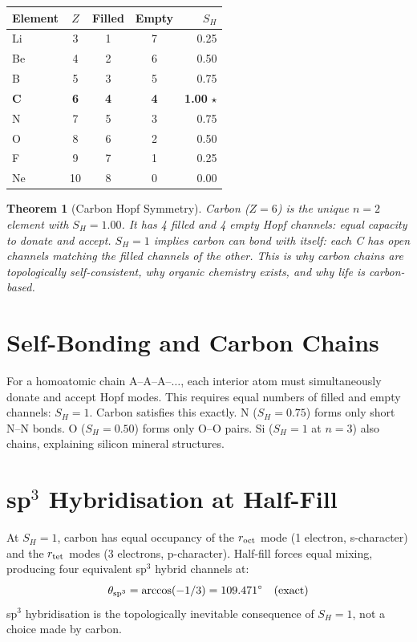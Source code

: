 \documentclass[aps,prl,twocolumn,showpacs,superscriptaddress]{revtex4-2}
\newtheorem{theorem}{Theorem}
\begin{document}
\begin{center}
\begin{tabular}{lcccr}
\toprule
Element & $Z$ & Filled & Empty & $S_H$ \\
\midrule
Li & 3 & 1 & 7 & 0.25 \\
Be & 4 & 2 & 6 & 0.50 \\
B  & 5 & 3 & 5 & 0.75 \\
\textbf{C}  & \textbf{6} & \textbf{4} & \textbf{4} & \textbf{1.00} $\star$ \\
N  & 7 & 5 & 3 & 0.75 \\
O  & 8 & 6 & 2 & 0.50 \\
F  & 9 & 7 & 1 & 0.25 \\
Ne & 10 & 8 & 0 & 0.00 \\
\bottomrule
\end{tabular}
\end{center}

\begin{theorem}[Carbon Hopf Symmetry]
Carbon ($Z=6$) is the unique $n=2$ element with $S_H = 1.00$. 
It has 4 filled and 4 empty Hopf channels: equal capacity to 
donate and accept. $S_H = 1$ implies carbon can bond with itself: 
each C has open channels matching the filled channels of the 
other. This is why carbon chains are topologically self-consistent, 
why organic chemistry exists, and why life is carbon-based.
\end{theorem}

\section{Self-Bonding and Carbon Chains}

For a homoatomic chain A--A--A--$\ldots$, each interior atom must 
simultaneously donate and accept Hopf modes. This requires equal 
numbers of filled and empty channels: $S_H = 1$. Carbon satisfies 
this exactly. N ($S_H=0.75$) forms only short N--N bonds. O 
($S_H=0.50$) forms only O--O pairs. Si ($S_H=1$ at $n=3$) also 
chains, explaining silicon mineral structures.

\section{sp$^3$ Hybridisation at Half-Fill}

At $S_H=1$, carbon has equal occupancy of the $r_{\rm oct}$ mode 
(1 electron, s-character) and the $r_{\rm tet}$ modes (3 electrons, 
p-character). Half-fill forces equal mixing, producing four 
equivalent sp$^3$ hybrid channels at:
\begin{equation}
    \theta_{\rm sp^3} = \arccos(-1/3) = 109.471^\circ \quad\text{(exact)}
\end{equation}
sp$^3$ hybridisation is the topologically inevitable consequence 
of $S_H = 1$, not a choice made by carbon.
\end{document}

